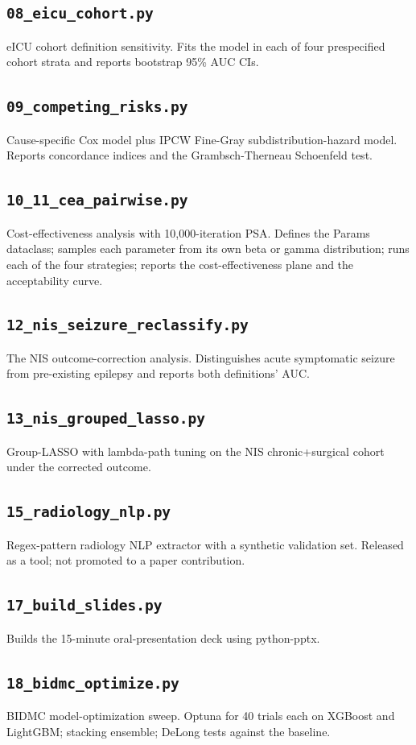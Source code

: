 \documentclass[11pt,a4paper]{article}
\begin{document}
\subsection{\texttt{08\_eicu\_cohort.py}}
eICU cohort definition sensitivity. Fits the model in each of four prespecified cohort strata and reports bootstrap 95\% AUC CIs.
\subsection{\texttt{09\_competing\_risks.py}}
Cause-specific Cox model plus IPCW Fine-Gray subdistribution-hazard model. Reports concordance indices and the Grambsch-Therneau Schoenfeld test.
\subsection{\texttt{10\_11\_cea\_pairwise.py}}
Cost-effectiveness analysis with 10,000-iteration PSA. Defines the Params dataclass; samples each parameter from its own beta or gamma distribution; runs each of the four strategies; reports the cost-effectiveness plane and the acceptability curve.
\subsection{\texttt{12\_nis\_seizure\_reclassify.py}}
The NIS outcome-correction analysis. Distinguishes acute symptomatic seizure from pre-existing epilepsy and reports both definitions' AUC.
\subsection{\texttt{13\_nis\_grouped\_lasso.py}}
Group-LASSO with lambda-path tuning on the NIS chronic+surgical cohort under the corrected outcome.
\subsection{\texttt{15\_radiology\_nlp.py}}
Regex-pattern radiology NLP extractor with a synthetic validation set. Released as a tool; not promoted to a paper contribution.
\subsection{\texttt{17\_build\_slides.py}}
Builds the 15-minute oral-presentation deck using python-pptx.
\subsection{\texttt{18\_bidmc\_optimize.py}}
BIDMC model-optimization sweep. Optuna for 40 trials each on XGBoost and LightGBM; stacking ensemble; DeLong tests against the baseline.
\end{document}
